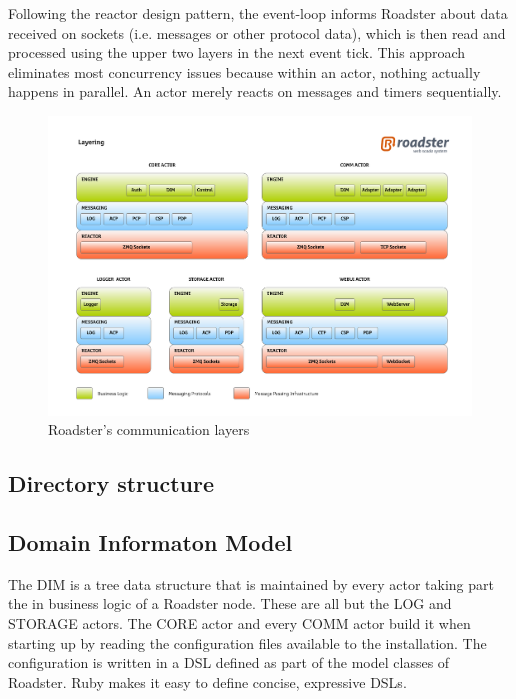 Following the reactor design pattern, the event-loop informs Roadster about
data received on sockets (i.e. \zmq messages or other protocol data), which is
then read and processed using the upper two layers in the next event
tick. This approach eliminates most concurrency issues because within an actor,
nothing actually happens in parallel. An actor merely reacts on messages and
timers sequentially.

\begin{figure}[]
	\includegraphics[trim=1.95cm 2.5cm 1.65cm 2.8cm, clip=true, width=\textwidth]{img/roadster_layering.pdf}
	\caption{Roadster's communication layers}
	\label{fig:roadster:layers}
\end{figure}


\subsection{Directory structure}


\subsection{Domain Informaton Model}
The \acrfull{DIM} is a tree data structure that is maintained by every actor taking part the in business logic of a Roadster node. These are all but the LOG and STORAGE actors.
The CORE actor and every COMM actor build it when starting up by reading the configuration
files available to the installation. The configuration is written in a \gls{DSL} defined as part of the model classes of Roadster. Ruby makes it easy to define concise, expressive DSLs.

